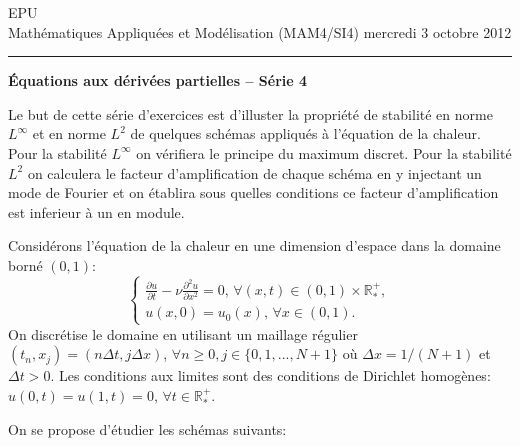 \documentclass[12pt,a4paper]{article}
\begin{document}
 \hfill EPU\\
\noindent Math\'ematiques Appliqu\'ees et Mod\'elisation (MAM4/SI4) \hfill mercredi 3 octobre 2012 \\

\hrule

\bigskip
\bigskip

\begin{center}{\bf \'Equations aux d\'eriv\'ees partielles --
S\'erie 4}\end{center}

\bigskip

\parskip 12pt
\noindent Le but de cette s\'erie d'exercices est d'illuster la
propri\'et\'e de stabilit\'e en norme $L^\infty$ et en norme $L^2$ de quelques sch\'emas appliqu\'es \`a l'\'equation de la
chaleur.  Pour la stabilit\'e  $L^\infty$ on v\'erifiera le principe
du maximum discret. Pour la stabilit\'e $L^2$ on calculera le facteur
d'amplification de chaque sch\'ema en y injectant un mode de Fourier
et on \'etablira sous quelles conditions ce facteur d'amplification
est inferieur \`a un en module.
 
\noindent Consid\'erons l'\'equation de la chaleur en une dimension d'espace dans la domaine born\'e $(0,1)$:
$$
\begin{cases}
\displaystyle\frac{\partial u}{\partial t}-\nu \frac{\partial^2 u}{\partial x^2}=0,\, \forall (x,t)\in(0,1)\times\mathbb{R}^+_*,\\[2ex]
u(x,0)=u_0(x),\,\forall x\in (0,1).
\end{cases}
$$
On discr\'etise le domaine en utilisant un maillage r\'egulier
$(t_n,x_j)=(n\Delta t,j\Delta x)$,  $\forall n\ge 0,
j\in\{0,1,...,N+1\}$ o\`u $\Delta x=1/(N+1)$ et $\Delta t>0$. Les
conditions aux limites sont des conditions de Dirichlet homog\`enes:
$u(0,t)=u(1,t)=0,\,\forall t\in\mathbb{R}^+_*$. 

\noindent On se propose d'\'etudier les sch\'emas suivants:
\end{document}
